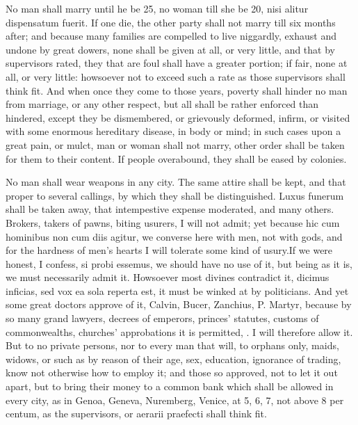 {No man shall marry until he be 25, no woman till she be 20, 
nisi alitur dispensatum fuerit. If one die, the other party shall
not marry till six months after; and because many families are
compelled to live niggardly, exhaust and undone by great dowers,
none shall be given at all, or very little, and that by
supervisors rated, they that are foul shall have a greater portion; if
fair, none at all, or very little: howsoever not to exceed such a
rate as those supervisors shall think fit. And when once they come to
those years, poverty shall hinder no man from marriage, or any other
respect, but all shall be rather enforced than hindered,
except they be dismembered, or grievously deformed, infirm,
or visited with some enormous hereditary disease, in body or mind; in
such cases upon a great pain, or mulct, man or woman shall not
marry, other order shall be taken for them to their content. If people
overabound, they shall be eased by colonies.

No man shall wear weapons in any city. The same attire shall be
kept, and that proper to several callings, by which they shall be
distinguished. Luxus funerum shall be taken away, that
intempestive expense moderated, and many others. Brokers, takers of
pawns, biting usurers, I will not admit; yet because hic cum hominibus
non cum diis agitur, we converse here with men, not with gods, and for
the hardness of men's hearts I will tolerate some kind of usury.If
we were honest, I confess, si probi essemus, we should have no use of
it, but being as it is, we must necessarily admit it. Howsoever most
divines contradict it, dicimus inficias, sed vox ea sola reperta est,
it must be winked at by politicians. And yet some great doctors approve
of it, Calvin, Bucer, Zanchius, P. Martyr, because by so many grand
lawyers, decrees of emperors, princes' statutes, customs of
commonwealths, churches' approbations it is permitted, \etc{}. I will
therefore allow it. But to no private persons, nor to every man that
will, to orphans only, maids, widows, or such as by reason of their
age, sex, education, ignorance of trading, know not otherwise how to
employ it; and those so approved, not to let it out apart, but to bring
their money to a common bank which shall be allowed in every city,
as in Genoa, Geneva, Nuremberg, Venice, at 5, 6, 7, not above 8
per centum, as the supervisors, or aerarii praefecti shall think fit.

}

